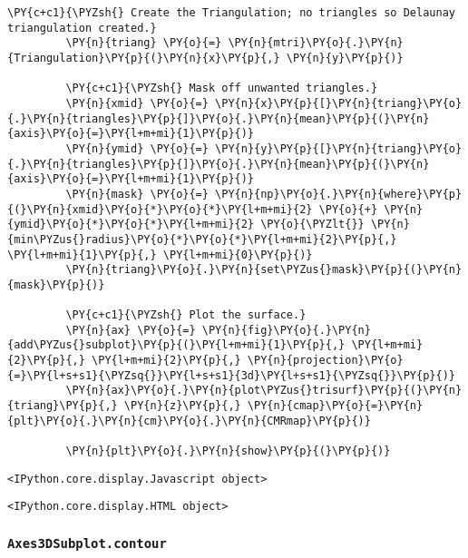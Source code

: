 \begin{Verbatim}[commandchars=\\\{\},frame=single,framerule=0.3mm,rulecolor=\color{cellframecolor}]
         \PY{c+c1}{\PYZsh{} Create the Triangulation; no triangles so Delaunay triangulation created.}
         \PY{n}{triang} \PY{o}{=} \PY{n}{mtri}\PY{o}{.}\PY{n}{Triangulation}\PY{p}{(}\PY{n}{x}\PY{p}{,} \PY{n}{y}\PY{p}{)}
         
         \PY{c+c1}{\PYZsh{} Mask off unwanted triangles.}
         \PY{n}{xmid} \PY{o}{=} \PY{n}{x}\PY{p}{[}\PY{n}{triang}\PY{o}{.}\PY{n}{triangles}\PY{p}{]}\PY{o}{.}\PY{n}{mean}\PY{p}{(}\PY{n}{axis}\PY{o}{=}\PY{l+m+mi}{1}\PY{p}{)}
         \PY{n}{ymid} \PY{o}{=} \PY{n}{y}\PY{p}{[}\PY{n}{triang}\PY{o}{.}\PY{n}{triangles}\PY{p}{]}\PY{o}{.}\PY{n}{mean}\PY{p}{(}\PY{n}{axis}\PY{o}{=}\PY{l+m+mi}{1}\PY{p}{)}
         \PY{n}{mask} \PY{o}{=} \PY{n}{np}\PY{o}{.}\PY{n}{where}\PY{p}{(}\PY{n}{xmid}\PY{o}{*}\PY{o}{*}\PY{l+m+mi}{2} \PY{o}{+} \PY{n}{ymid}\PY{o}{*}\PY{o}{*}\PY{l+m+mi}{2} \PY{o}{\PYZlt{}} \PY{n}{min\PYZus{}radius}\PY{o}{*}\PY{o}{*}\PY{l+m+mi}{2}\PY{p}{,} \PY{l+m+mi}{1}\PY{p}{,} \PY{l+m+mi}{0}\PY{p}{)}
         \PY{n}{triang}\PY{o}{.}\PY{n}{set\PYZus{}mask}\PY{p}{(}\PY{n}{mask}\PY{p}{)}
         
         \PY{c+c1}{\PYZsh{} Plot the surface.}
         \PY{n}{ax} \PY{o}{=} \PY{n}{fig}\PY{o}{.}\PY{n}{add\PYZus{}subplot}\PY{p}{(}\PY{l+m+mi}{1}\PY{p}{,} \PY{l+m+mi}{2}\PY{p}{,} \PY{l+m+mi}{2}\PY{p}{,} \PY{n}{projection}\PY{o}{=}\PY{l+s+s1}{\PYZsq{}}\PY{l+s+s1}{3d}\PY{l+s+s1}{\PYZsq{}}\PY{p}{)}
         \PY{n}{ax}\PY{o}{.}\PY{n}{plot\PYZus{}trisurf}\PY{p}{(}\PY{n}{triang}\PY{p}{,} \PY{n}{z}\PY{p}{,} \PY{n}{cmap}\PY{o}{=}\PY{n}{plt}\PY{o}{.}\PY{n}{cm}\PY{o}{.}\PY{n}{CMRmap}\PY{p}{)}
         
         \PY{n}{plt}\PY{o}{.}\PY{n}{show}\PY{p}{(}\PY{p}{)}
\end{Verbatim}


    
    \begin{verbatim}
<IPython.core.display.Javascript object>
    \end{verbatim}

    
    
    \begin{verbatim}
<IPython.core.display.HTML object>
    \end{verbatim}

    
    \hypertarget{axes3dsubplot.contour}{%
\subsubsection{\texorpdfstring{\texttt{Axes3DSubplot.contour}}{Axes3DSubplot.contour}}\label{axes3dsubplot.contour}}

